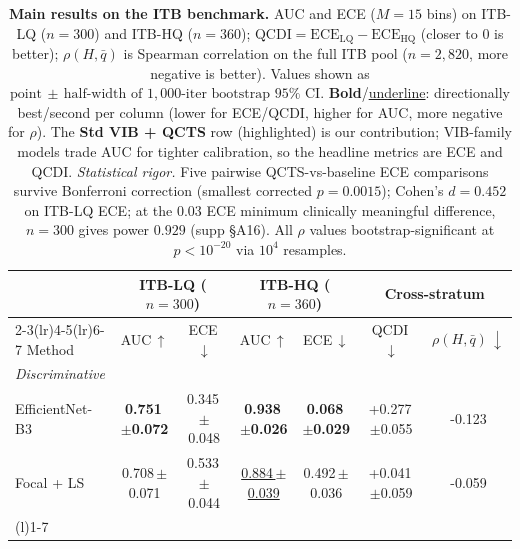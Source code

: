 \begin{table}[!tbp]
\centering
\caption{\textbf{Main results on the ITB benchmark.}
AUC and ECE ($M{=}15$ bins) on ITB-LQ ($n{=}300$) and ITB-HQ ($n{=}360$); $\text{QCDI}=\mathrm{ECE}_\mathrm{LQ}-\mathrm{ECE}_\mathrm{HQ}$ (closer to $0$ is better); $\rho(H,\bar q)$ is Spearman correlation on the full ITB pool ($n{=}2{,}820$, more negative is better). Values shown as $\text{point}\,{\scriptscriptstyle\pm}\,\text{half-width of $1{,}000$-iter bootstrap $95\%$ CI}$. \textbf{Bold}/\underline{underline}: directionally best/second per column (lower for ECE/QCDI, higher for AUC, more negative for $\rho$). The \textbf{Std VIB + QCTS} row (highlighted) is our contribution; VIB-family models trade AUC for tighter calibration, so the headline metrics are ECE and QCDI. \emph{Statistical rigor.} Five pairwise QCTS-vs-baseline ECE comparisons survive Bonferroni correction (smallest corrected $p{=}0.0015$); Cohen's $d{=}0.452$ on ITB-LQ ECE; at the $0.03$ ECE minimum clinically meaningful difference, $n{=}300$ gives power $0.929$ (supp \S A16). All $\rho$ values bootstrap-significant at $p{<}10^{-20}$ via $10^4$ resamples.}
\label{tab:main}
\vspace{4pt}
\footnotesize
\setlength{\tabcolsep}{4.5pt}
\renewcommand{\arraystretch}{1.05}
\begin{tabular}{l cc cc cc}
\toprule
& \multicolumn{2}{c}{\textbf{ITB-LQ} ($n{=}300$)}  & \multicolumn{2}{c}{\textbf{ITB-HQ} ($n{=}360$)}  & \multicolumn{2}{c}{\textbf{Cross-stratum}} \\
\cmidrule(lr){2-3}\cmidrule(lr){4-5}\cmidrule(lr){6-7}
Method & AUC\,$\uparrow$ & ECE\,$\downarrow$ & AUC\,$\uparrow$ & ECE\,$\downarrow$ & QCDI\,$\downarrow$ & $\rho(H,\bar q)\,\downarrow$ \\
\midrule
\multicolumn{7}{l}{\textit{Discriminative}} \\
EfficientNet-B3 & \textbf{0.751{\tiny\,$\pm$0.072}} & \cellcolor{red!11}0.345{\tiny\,$\pm$0.048} & \textbf{0.938{\tiny\,$\pm$0.026}} & \textbf{0.068{\tiny\,$\pm$0.029}} & \cellcolor{red!22}+0.277{\tiny\,$\pm$0.055} & \cellcolor{red!15}-0.123 \\
Focal + LS & 0.708{\tiny\,$\pm$0.071} & \cellcolor{red!19}0.533{\tiny\,$\pm$0.044} & \underline{0.884{\tiny\,$\pm$0.039}} & \cellcolor{red!22}0.492{\tiny\,$\pm$0.036} & \cellcolor{red!3}+0.041{\tiny\,$\pm$0.059} & \cellcolor{red!13}-0.059 \\
\addlinespace[2pt]\cmidrule(l){1-7}\addlinespace[2pt]
\multicolumn{7}{l}{\textit{Bayesian / ensemble}} \\

\end{tabular}
\end{table}
